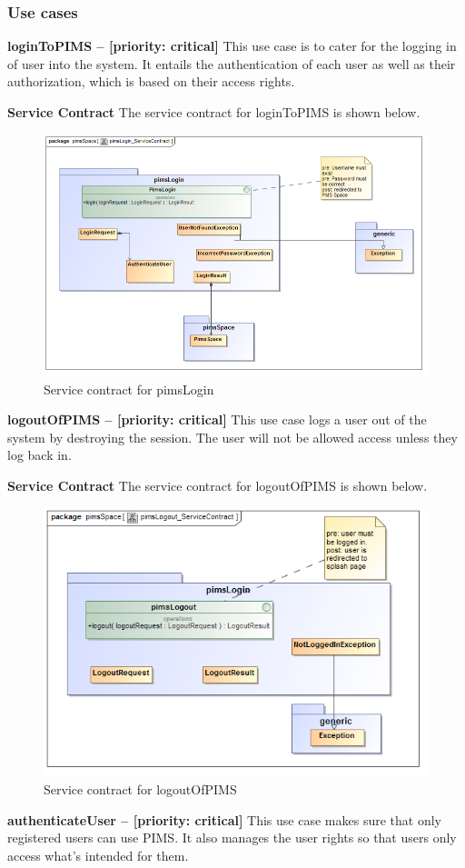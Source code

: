 \subsubsection{Use cases}
\begin{description}
	\item{\textbf{loginToPIMS -- [priority: critical] }}
	This use case is to cater for the logging in of user into the system. It entails the authentication of each user as well as their authorization, which is based on their access rights.
	\begin{description}
	\item{\textbf{Service Contract}} The service contract for loginToPIMS is shown below.
		\begin{figure}[H]
			\centerline{\includegraphics[width=0.7\linewidth]{./Graphics/pimsLogin/pimsLogin_ServiceContract}}
			\caption{Service contract for pimsLogin}
		\end{figure}
	\end{description}
	\item{\textbf{logoutOfPIMS -- [priority: critical]}}
	This use case logs a user out of the system by destroying the session. The user will not be allowed access unless they log back in.
	\begin{description}
	\item{\textbf{Service Contract}} The service contract for logoutOfPIMS is shown below.
		\begin{figure}[H]
			\centerline{\includegraphics[width=0.7\linewidth]{./Graphics/pimsLogin/pimsLogout_ServiceContract}}
			\caption{Service contract for logoutOfPIMS }
		\end{figure}
	\end{description}
	
		\item{\textbf{authenticateUser -- [priority: critical]}}
	This use case makes sure that only registered users can use PIMS. It also manages the user rights so that users only access what's intended for them.
\end{description}
